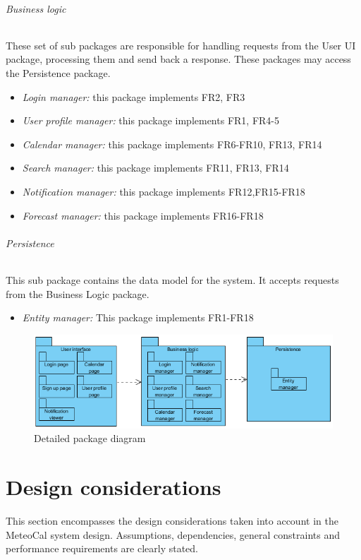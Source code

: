 \documentclass[10pt,a4paper,titlepage]{article}
\begin{document}
\paragraph{Business logic}
These set of sub packages are responsible for handling requests from the User UI package, processing them and send back a response. These packages may access the Persistence package.
\begin{itemize}
\item \emph{Login manager:} this package implements FR2, FR3
\item \emph{User profile manager:} this package implements FR1, FR4-5
\item \emph{Calendar manager:} this package implements FR6-FR10, FR13, FR14
\item \emph{Search manager:} this package implements FR11, FR13, FR14
\item \emph{Notification manager:} this package implements FR12,FR15-FR18
\item \emph{Forecast manager:} this package implements FR16-FR18
\end{itemize}

\paragraph{Persistence}
This sub package contains the data model for the system. It accepts requests from the Business Logic package.
\begin{itemize}
\item \emph{Entity manager:} This package implements FR1-FR18
\end{itemize}

\begin{figure}[h!]
\centering
\includegraphics[width=\linewidth]{./images/detailed-package}
\caption[Detailed package]{Detailed package diagram}
\label{fig:detailed-package}
\end{figure}

\clearpage
\part{Design considerations}
\label{part:design-considerations}
This section encompasses the design considerations taken into account in the MeteoCal system design. Assumptions, dependencies, general constraints and performance requirements are clearly stated.
\end{document}
